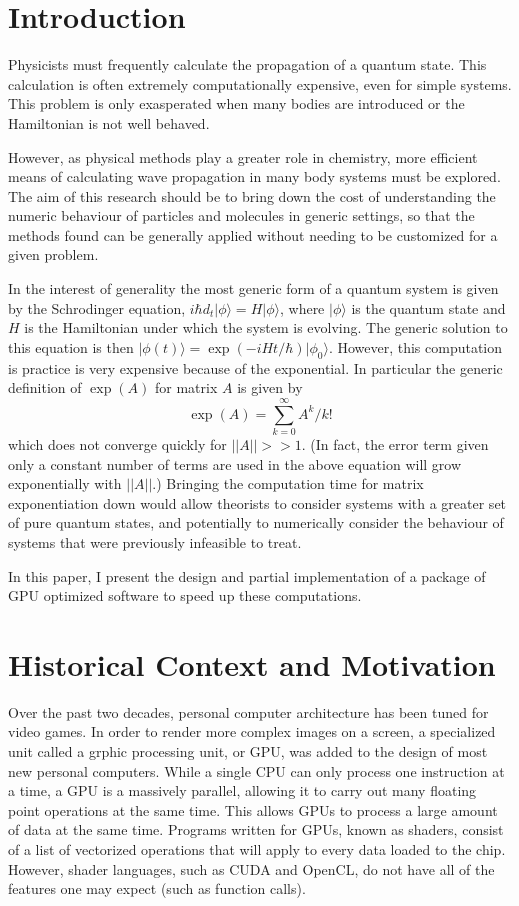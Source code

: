 \documentclass[%
 reprint,
 amsmath,amssymb,
 aps,
]{revtex4-1}
\begin{document}

\section{Introduction}
Physicists must frequently calculate the propagation of a quantum state. This calculation is often extremely computationally expensive, even for simple systems. This problem is only exasperated when many bodies are introduced or the Hamiltonian is not well behaved. %

However, as physical methods play a greater role in chemistry, more efficient means of calculating wave propagation in many body systems must be explored. The aim of this research should be to bring down the cost of understanding the numeric behaviour of particles and molecules in generic settings, so that the methods found can be generally applied without needing to be customized for a given problem. %

In the interest of generality the most generic form of a quantum system is given by the Schrodinger equation, $i\hbar d_t|\phi\rangle = H|\phi\rangle$, where $|\phi\rangle$ is the quantum state and $H$ is the Hamiltonian under which the system is evolving. The generic solution to this equation is then $|\phi (t)\rangle = \exp(-iHt/\hbar ) |\phi_0\rangle $. However, this computation is practice is very expensive because of the exponential. In particular the generic definition of $\exp (A)$ for matrix $A$ is given by
\[ \exp (A) = \sum_{k=0}^\infty A^k/k! \]
which does not converge quickly for $||A||>>1$. %
(In fact, the error term given only a constant number of terms are used in the above equation will grow exponentially with $||A||$.)
Bringing the computation time for matrix exponentiation down would allow theorists to consider systems with a greater set of pure quantum states, and potentially to numerically consider the behaviour of systems that were previously infeasible to treat. %

In this paper, I present the design and partial implementation of a package of GPU optimized software to speed up these computations. %


\section{Historical Context and Motivation}

Over the past two decades, personal computer architecture has been tuned for video games. In order to render more complex images on a screen, a specialized unit called a grphic processing unit, or GPU, was added to the design of most new personal computers. While a single CPU can only process one instruction at a time, a GPU is a massively parallel, allowing it to carry out many floating point operations at the same time. This allows GPUs to process a large amount of data at the same time. Programs written for GPUs, known as shaders, consist of a list of vectorized operations that will apply to every data loaded to the chip. However, shader languages, such as CUDA and OpenCL, do not have all of the features one may expect (such as function calls). %
\end{document}
